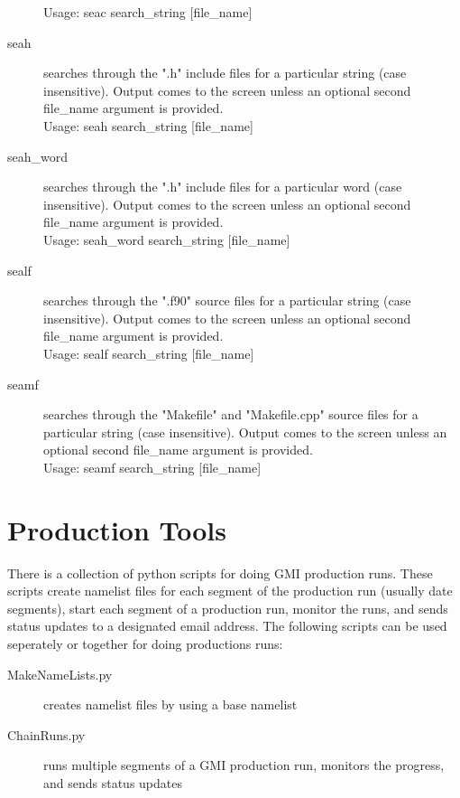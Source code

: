 \begin{description}
   Usage:  seac search\_string [file\_name]
\item[seah] searches through the ".h" include files for a
   particular string (case insensitive). Output comes to the screen unless
   an optional second file\_name argument is provided. \\
   Usage:  seah search\_string [file\_name]
\item[seah\_word]  searches through the ".h" include files for a
   particular word (case insensitive).  Output comes to the screen unless
   an optional second file\_name argument is provided. \\
   Usage:  seah\_word search\_string [file\_name]
\item[sealf] searches through the ".f90" source files for a
   particular string (case insensitive).  Output comes to the screen
   unless an optional second file\_name argument is provided. \\
   Usage:  sealf search\_string [file\_name]
\item[seamf] searches through the "Makefile" and  "Makefile.cpp" source files
   for a particular string (case insensitive).  Output comes to the screen
   unless an optional second file\_name argument is provided. \\
   Usage:  seamf search\_string [file\_name]
\end{description}


\section{Production Tools} \label{section:production}
There is a collection of python scripts for doing GMI production runs. 
These scripts create namelist files for each segment of the production run 
(usually date segments), start each segment of a production run,
monitor the runs, and sends status updates to a designated email address.
The following scripts can be used seperately or together for doing productions
runs:
\begin{description}
\item[MakeNameLists.py] creates namelist files by using a base namelist \\ 
\item[ChainRuns.py] runs multiple segments of a GMI production run, monitors 
   the progress, and sends status updates
\end{description}

